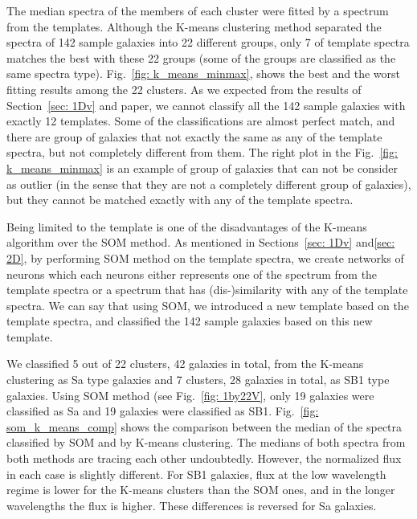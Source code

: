 The median spectra of the members of each cluster were fitted by a spectrum from the  templates.
Although the K-means clustering method separated the spectra of 142 sample galaxies into 22 different groups, only 7 of template spectra matches the best with these 22 groups (some of the groups are classified as the same spectra type).
Fig.~\ref{fig: k_means_minmax}, shows the best and the worst fitting results among the 22 clusters. 
As we expected from the results of Section~\ref{sec: 1Dv} and  paper, we cannot classify all the 142 sample galaxies with exactly 12 templates. 
Some of the classifications are almost perfect match, and there are group of galaxies that not exactly the same as any of the template spectra, but not completely different from them. 
The right plot in the Fig.~\ref{fig: k_means_minmax} is an example of group of galaxies that can not be consider as outlier (in the sense that they are not a completely different group of galaxies), but they cannot be matched exactly with any of the template spectra.

Being limited to the template is one of the disadvantages of the K-means algorithm over the SOM method. 
As mentioned in Sections~\ref{sec: 1Dv} and\ref{sec: 2D}, by performing SOM method on the template spectra, we create networks of neurons which each neurons either represents one of the spectrum from the template spectra or a spectrum that has (dis-)similarity with any of the template spectra. 
We can say that using SOM, we introduced a new template based on the  template spectra, and classified the 142 sample galaxies based on this new template.

We classified 5 out of 22 clusters, 42 galaxies in total, from the K-means clustering as Sa type galaxies and 7 clusters, 28 galaxies in total, as SB1 type galaxies.
Using SOM method (see Fig.~\ref{fig: 1by22V}, only 19 galaxies were classified as Sa and 19 galaxies were classified as SB1. 
Fig.~\ref{fig: som_k_means_comp} shows the comparison between the median of the spectra classified by SOM and by K-means clustering. 
The medians of both spectra from both methods are tracing each other undoubtedly.
However, the normalized flux in each case is slightly different. 
For SB1 galaxies, flux at the low wavelength regime is lower for the K-means clusters than the SOM ones, and in the longer wavelengths the flux is higher.
These differences is reversed for Sa galaxies.

